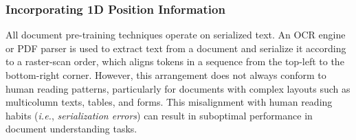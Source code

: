 




\subsubsection{Incorporating 1D Position Information}

All document pre-training techniques operate on serialized text. An \ac{OCR} engine or PDF parser is used to extract text from a document and serialize it according to a raster-scan order, which aligns tokens in a sequence from the top-left to the bottom-right corner. However, this arrangement does not always conform to human reading patterns, particularly for documents with complex layouts such as multicolumn texts, tables, and forms. This misalignment with human reading habits (\textit{i.e.}, \textit{serialization errors}) can result in suboptimal performance in document understanding tasks. 

